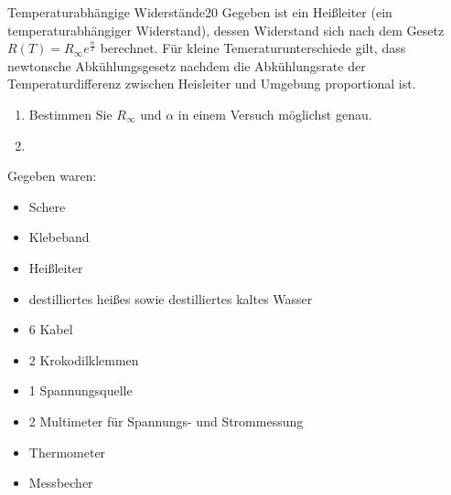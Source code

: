 \begin{problem}{Temperaturabhängige Widerstände}{20}
Gegeben ist ein Heißleiter (ein temperaturabhängiger Widerstand), dessen Widerstand sich nach dem Gesetz $R(T)=R_{\infty}e^{\frac{\alpha}{T}}$ berechnet. Für kleine Temeraturunterschiede gilt, dass newtonsche Abkühlungsgesetz nachdem die Abkühlungsrate der Temperaturdifferenz zwischen Heisleiter und Umgebung proportional ist.
\begin{enumerate}
  \item Bestimmen Sie $R_{\infty}$ und $\alpha$ in einem Versuch möglichst genau. 
  \item {}
\end{enumerate}
Gegeben waren:
\begin{itemize}
 \item Schere
 \item Klebeband
 \item Heißleiter
 \item destilliertes heißes sowie destilliertes kaltes Wasser
 \item 6 Kabel
 \item 2 Krokodilklemmen
 \item 1 Spannungsquelle
 \item 2 Multimeter für Spannungs- und Strommessung
 \item Thermometer
 \item Messbecher
\end{itemize}
\end{problem}


